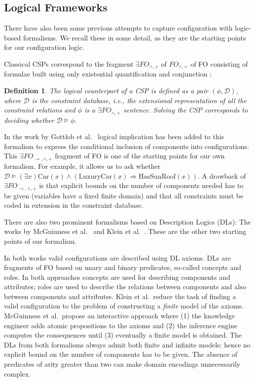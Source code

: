 \documentclass[copyright,creativecommons]{eptcs}
\newcommand{\Dmc}{\ensuremath{\mathcal{D}}\xspace}
\newtheorem{definition}{Definition}
\begin{document}
\subsection{Logical Frameworks}

There have also been some previous attempts to capture configuration with logic-based formalisms. 
We recall these in some detail, as they are the starting points for our configuration logic.

Classical CSPs correspond to the fragment $\exists FO_{\wedge, +}$ of $FO_{\wedge, +}$ of FO consisting of formulae built using only existential quantification and conjunction \cite{kolaitis:cqc_csp}\/:


\begin{definition}
The logical counterpart of a CSP is defined as a pair $(\phi, \mathcal{D})$, where $\mathcal{D}$ is the \textit{constraint database}, 
i.e., the extensional representation of all the constraint relations and $\phi$ is a $\exists FO_{\wedge, +}$ sentence.
Solving the CSP corresponds to deciding whether $\mathcal{D} \vDash \phi$.
\label{def:csp_logic}
\end{definition}

In the work by Gottlob et al.\ \cite{gottlob:conditional} logical implication has been added to this formalism to express the conditional inclusion of components into configurations.
This $\exists FO_{\rightarrow, \wedge, +}$ fragment of FO is one of the starting points for our own formalism.
For example, it allows us to ask whether $\Dmc \vDash (\exists x) \text{Car}(x) \land (\text{LuxuryCar}(x)\Rightarrow\text{HasSunRoof}(x))$.
A drawback of $\exists FO_{\rightarrow, \wedge, +}$ is that explicit bounds on the number of components needed has to be given (variables have a fixed finite domain)
and that all constraints must be coded in extension in the constraint database. 

There are also two prominent formalisms based on Description Logics (DLs)\/: 
The works by McGuinness et al.\ \cite{McguinnessW98} and Klein et al.\ \cite{DFKI-TM-95-01}. 
These are the other two starting points of our formalism.

In both works valid configurations are described using DL axioms. 
DLs are fragments of FO based on unary and binary predicates, so-called concepts and roles.
In both approaches concepts are used for describing components and attributes; roles are used to describe the relations between components and also between components and attributes.
Klein et al.\ reduce the task of finding a valid configuration to the problem of constructing a {\em finite} model of the axioms. 
McGuinness et al.\ propose an interactive approach where (1) the knowledge engineer adds atomic propositions to the axioms and (2) the inference engine computes the consequences until (3) eventually a finite model is obtained. 
The DLs from both formalisms always admit both finite and infinite models; hence no explicit bound on the number of components has to be given.
The absence of predicates of arity greater than two can make domain encodings unnecessarily complex.
\end{document}
